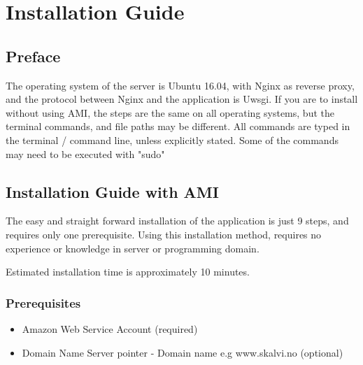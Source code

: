 


\chapter{Installation Guide}
\label{Installation Guide}

\section{Preface}
The operating system of the server is Ubuntu 16.04, with Nginx as reverse proxy, and the protocol between Nginx and the application is Uwsgi. If you are to install without using AMI, the steps are the same on all operating systems, but the terminal commands, and file paths may be different.
All commands are typed in the terminal / command line, unless explicitly stated. Some of the commands may need to be executed with "sudo"

\section{Installation Guide with AMI}
The easy and straight forward installation of the application is just 9 steps, and requires only one prerequisite. Using this installation method, requires no experience or knowledge in server or programming domain. 

Estimated installation time is approximately 10 minutes.

\subsection{Prerequisites}
\begin{itemize}  
\item Amazon Web Service Account (required)
\item Domain Name Server pointer - Domain name e.g www.skalvi.no (optional)
\end{itemize}

